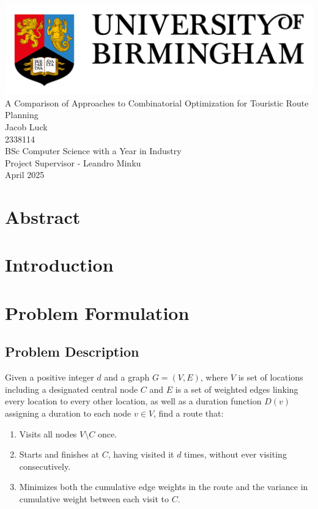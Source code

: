 \documentclass[a4paper,12pt]{article}
\begin{document}
    \begin{titlepage}
        \centering
        \includegraphics[width = 1\textwidth]{UoB_Logo}\\[10ex]
        \Huge{A Comparison of Approaches to Combinatorial Optimization for Touristic Route Planning}\\[14ex]
        \LARGE{Jacob Luck}\\
        \large{2338114}\\[2ex]
        \Large{BSc Computer Science with a Year in Industry}\\
        \Large{Project Supervisor - Leandro Minku}\\[2ex]
        \large{April 2025}
    \end{titlepage}

    \tableofcontents

    \pagebreak

    \section*{Abstract}

    \section{Introduction}\label{sec:introduction}

    \pagebreak
    
    \section{Problem Formulation}\label{sec:problem-formulation}
    \subsection{Problem Description}\label{subsec:problem-description}
    Given a positive integer $d$ and a graph $G = (V, E)$, where $V$ is set of locations including a designated
    central node $C$ and $E$ is a set of weighted edges linking every location to every other location, as well as a
    duration function $D(v)$ assigning a duration to each node $v \in V$, find a route that:
    \begin{enumerate}
        \item Visits all nodes $V \setminus C$ once.
        \item Starts and finishes at $C$, having visited it $d$ times, without ever visiting consecutively.
        \item Minimizes both the cumulative edge weights in the route and the variance in cumulative weight between
        each visit to $C$.
    \end{enumerate}\\
\end{document}
